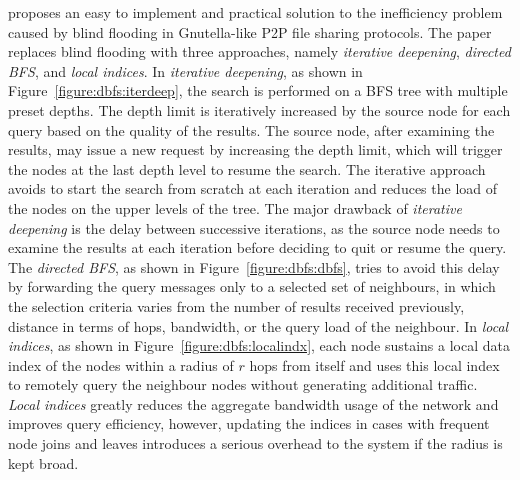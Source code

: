 \cite{yang_improvep2psearch_2002} proposes an easy to implement and practical
solution to the inefficiency problem caused by blind flooding in Gnutella-like
P2P file sharing protocols. The paper replaces blind flooding with three
approaches, namely \textit{iterative deepening}, \textit{directed BFS}, and
\textit{local indices}. In \textit{iterative deepening}, as shown in
Figure~\ref{figure:dbfs:iterdeep}, the search is performed on a BFS tree with
multiple preset depths. The depth limit is iteratively increased by the source
node for each query based on the quality of the results. The source node, after
examining the results, may issue a new request by increasing the depth limit,
which will trigger the nodes at the last depth level to resume the search. The
iterative approach avoids to start the search from scratch at each iteration and
reduces the load of the nodes on the upper levels of the tree. The major
drawback of \textit{iterative deepening} is the delay between successive
iterations, as the source node needs to examine the results at each iteration
before deciding to quit or resume the query.  The \textit{directed BFS}, as
shown in Figure~\ref{figure:dbfs:dbfs}, tries to avoid this delay by
forwarding the query messages only to a selected set of neighbours, in which the
selection criteria varies from the number of results received previously,
distance in terms of hops, bandwidth, or the query load of the neighbour. In
\textit{local indices}, as shown in Figure~\ref{figure:dbfs:localindx}, each
node sustains a local data index of the nodes within a radius of $r$ hops from
itself and uses this local index to remotely query the neighbour nodes without
generating additional traffic. \textit{Local indices} greatly reduces the
aggregate bandwidth usage of the network and improves query efficiency, however,
updating the indices in cases with frequent node joins and leaves introduces a
serious overhead to the system if the radius is kept broad.

